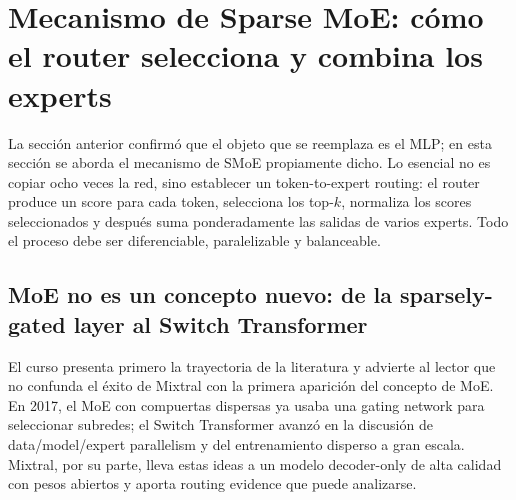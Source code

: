 \section{Mecanismo de Sparse MoE: cómo el router selecciona y combina los experts}

La sección anterior confirmó que el objeto que se reemplaza es el MLP; en esta sección se aborda el mecanismo de SMoE propiamente dicho. Lo esencial no es copiar ocho veces la red, sino establecer un token-to-expert routing: el router produce un score para cada token, selecciona los top-$k$, normaliza los scores seleccionados y después suma ponderadamente las salidas de varios experts. Todo el proceso debe ser diferenciable, paralelizable y balanceable.

\subsection{MoE no es un concepto nuevo: de la sparsely-gated layer al Switch Transformer}

El curso presenta primero la trayectoria de la literatura y advierte al lector que no confunda el éxito de Mixtral con la primera aparición del concepto de MoE. En 2017, el MoE con compuertas dispersas ya usaba una gating network para seleccionar subredes; el Switch Transformer avanzó en la discusión de data/model/expert parallelism y del entrenamiento disperso a gran escala. Mixtral, por su parte, lleva estas ideas a un modelo decoder-only de alta calidad con pesos abiertos y aporta routing evidence que puede analizarse.



